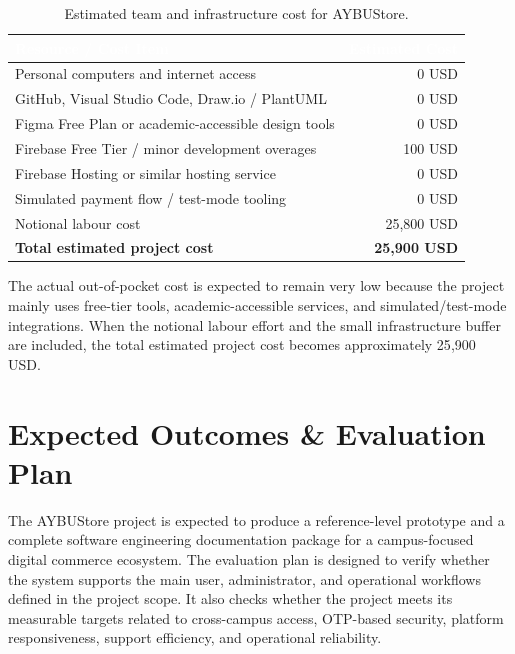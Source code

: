 \documentclass[11pt,a4paper]{article}
\begin{document}
\renewcommand{\arraystretch}{1.25}
\begin{table}[H]
\centering
\small
\begin{tabularx}{0.88\textwidth}{|X|r|}
\hline
\rowcolor{aybuHeader}
\textcolor{white}{\textbf{Resource / Cost Item}} &
\textcolor{white}{\textbf{Estimated Cost}} \\ \hline

Personal computers and internet access & 0 USD \\ \hline
GitHub, Visual Studio Code, Draw.io / PlantUML & 0 USD \\ \hline
Figma Free Plan or academic-accessible design tools & 0 USD \\ \hline
Firebase Free Tier / minor development overages & 100 USD \\ \hline
Firebase Hosting or similar hosting service & 0 USD \\ \hline
Simulated payment flow / test-mode tooling & 0 USD \\ \hline
Notional labour cost & 25{,}800 USD \\ \hline
\textbf{Total estimated project cost} & \textbf{25{,}900 USD} \\ \hline

\end{tabularx}
\caption{Estimated team and infrastructure cost for AYBUStore.}
\label{tab:team-resource-cost}
\end{table}

The actual out-of-pocket cost is expected to remain very low because the
project mainly uses free-tier tools, academic-accessible services, and
simulated/test-mode integrations. When the notional labour effort and the
small infrastructure buffer are included, the total estimated project cost
becomes approximately 25{,}900 USD.


\section{Expected Outcomes \& Evaluation Plan}
\label{sec:expected-outcomes-evaluation}

The AYBUStore project is expected to produce a reference-level
prototype and a complete software engineering documentation package
for a campus-focused digital commerce ecosystem. The evaluation plan
is designed to verify whether the system supports the main user,
administrator, and operational workflows defined in the project scope.
It also checks whether the project meets its measurable targets related
to cross-campus access, OTP-based security, platform responsiveness,
support efficiency, and operational reliability.
\end{document}
